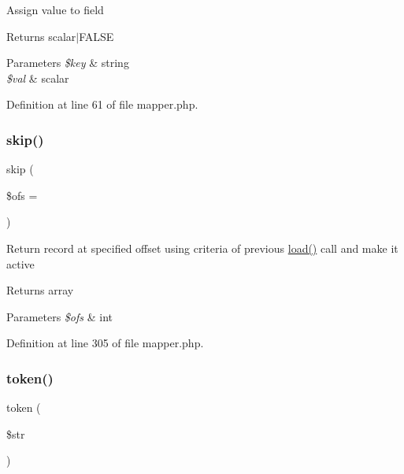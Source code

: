 Assign value to field \begin{DoxyReturn}{Returns}
scalar$\vert$\+F\+A\+L\+SE 
\end{DoxyReturn}

\begin{DoxyParams}{Parameters}
{\em \$key} & string \\
\hline
{\em \$val} & scalar \\
\hline
\end{DoxyParams}


Definition at line 61 of file mapper.\+php.

\hypertarget{class_d_b_1_1_jig_1_1_mapper_aad399d205074eaeed711d5e0157b3c0a}{}\label{class_d_b_1_1_jig_1_1_mapper_aad399d205074eaeed711d5e0157b3c0a} 
\subsubsection{\texorpdfstring{skip()}{skip()}}
{\footnotesize\ttfamily skip (\begin{DoxyParamCaption}\item[{}]{\$ofs = {} }\end{DoxyParamCaption})}

Return record at specified offset using criteria of previous \hyperlink{class_d_b_1_1_cursor_a4db66c122e6274a3d653eff639e8476f}{load()} call and make it active \begin{DoxyReturn}{Returns}
array 
\end{DoxyReturn}

\begin{DoxyParams}{Parameters}
{\em \$ofs} & int \\
\hline
\end{DoxyParams}


Definition at line 305 of file mapper.\+php.

\hypertarget{class_d_b_1_1_jig_1_1_mapper_a0a17b08b524058f3c3ce29d0985e83d6}{}\label{class_d_b_1_1_jig_1_1_mapper_a0a17b08b524058f3c3ce29d0985e83d6} 
\subsubsection{\texorpdfstring{token()}{token()}}
{\footnotesize\ttfamily token (\begin{DoxyParamCaption}\item[{}]{\$str }\end{DoxyParamCaption})}

